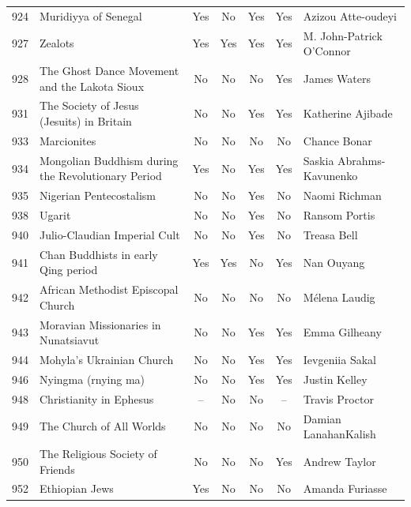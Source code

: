 {\begin{longtable}{rp{3.5cm}ccccp{3cm}}
924 & {\raggedright Muridiyya of Senegal} & Yes & No & Yes & Yes & {\raggedright Azizou Atte-oudeyi} \\
927 & {\raggedright Zealots} & Yes & Yes & Yes & Yes & {\raggedright M. John-Patrick O’Connor} \\
928 & {\raggedright The Ghost Dance Movement and the Lakota Sioux} & No & No & No & Yes & {\raggedright James Waters} \\
931 & {\raggedright The Society of Jesus (Jesuits) in Britain} & No & No & Yes & Yes & {\raggedright Katherine Ajibade} \\
933 & {\raggedright Marcionites} & No & No & No & No & {\raggedright Chance Bonar} \\
934 & {\raggedright Mongolian Buddhism during the Revolutionary Period} & Yes & No & Yes & Yes & {\raggedright Saskia Abrahms-Kavunenko} \\
935 & {\raggedright Nigerian Pentecostalism} & No & No & Yes & No & {\raggedright Naomi Richman} \\
938 & {\raggedright Ugarit} & No & No & Yes & No & {\raggedright Ransom Portis} \\
940 & {\raggedright Julio-Claudian Imperial Cult} & No & No & Yes & No & {\raggedright Treasa Bell} \\
941 & {\raggedright Chan Buddhists in early Qing period} & Yes & Yes & No & Yes & {\raggedright Nan Ouyang} \\
942 & {\raggedright African Methodist Episcopal Church} & No & No & No & No & {\raggedright Mélena Laudig} \\
943 & {\raggedright Moravian Missionaries in Nunatsiavut} & No & No & Yes & Yes & {\raggedright Emma Gilheany} \\
944 & {\raggedright Mohyla's Ukrainian Church} & No & No & Yes & Yes & {\raggedright Ievgeniia Sakal} \\
946 & {\raggedright Nyingma (rnying ma)} & No & No & Yes & Yes & {\raggedright Justin Kelley} \\
948 & {\raggedright Christianity in Ephesus} & -- & No & No & -- & {\raggedright Travis Proctor} \\
949 & {\raggedright The Church of All Worlds} & No & No & No & No & {\raggedright Damian LanahanKalish} \\
950 & {\raggedright The Religious Society of Friends} & No & No & No & Yes & {\raggedright Andrew Taylor} \\
952 & {\raggedright Ethiopian Jews} & Yes & No & No & No & {\raggedright Amanda Furiasse} \\

\end{longtable}}

